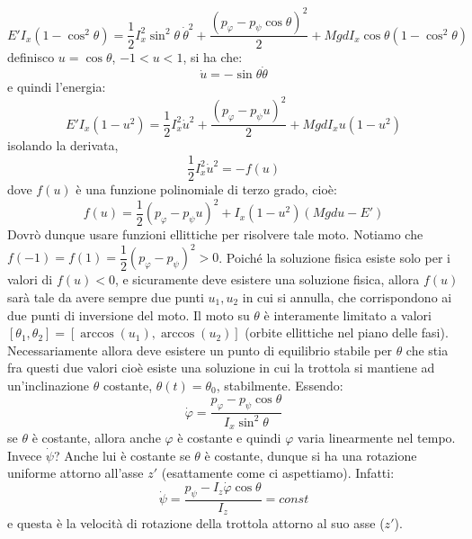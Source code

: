 \documentclass[a4paper,openany]{article}
\begin{document}
	$$
	E'I_x(1-\cos^2\theta) = \dfrac{1}{2}I_x^{2}\sin^2\theta\>\dot{\theta}^{2}+ \dfrac{(p_{\varphi}- p_{\psi}\cos\theta)^2}{2} + MgdI_x\cos\theta(1-\cos^2\theta) 
	$$
	definisco $u = \cos\theta$, $-1<u<1$, si ha che:
	$$
	\dot{u} = -\sin\theta \dot{\theta}
	$$
	e quindi l'energia:
	$$
	E'I_x(1-u^2) = \dfrac{1}{2}I_x^{2}\dot{u}^{2}+ \dfrac{(p_{\varphi}- p_{\psi}u)^2}{2} + MgdI_x u (1-u^2) 
	$$
	isolando la derivata,
	$$
	\dfrac{1}{2}I_x^{2} \dot{u}^2 = -f(u)
	$$
	dove $f(u)$ è una funzione polinomiale di terzo grado, cioè:
	$$
	f(u) = \dfrac{1}{2}(p_{\varphi}-p_{\psi}u)^2 + I_x(1-u^2)(Mgdu - E')
	$$
	Dovrò dunque usare funzioni ellittiche per risolvere tale moto. Notiamo che $f(-1) = f(1) = \dfrac{1}{2}(p_{\varphi}-p_{\psi})^2 > 0$. Poiché la soluzione fisica esiste solo per i valori di $f(u)<0$, e sicuramente deve esistere una soluzione fisica, allora $f(u)$ sarà tale da avere sempre due punti $u_1,u_2$ in cui si annulla, che corrispondono ai due punti di inversione del moto. Il moto su $\theta$ è interamente limitato a valori $[\theta_1,\theta_2] = [\arccos(u_1),\arccos(u_2)]$ (orbite ellittiche nel piano delle fasi). Necessariamente allora deve esistere un punto di equilibrio stabile per $\theta$ che stia fra questi due valori cioè esiste una soluzione in cui la trottola si mantiene ad un'inclinazione $\theta$ costante, $\theta(t) = \theta_0$, stabilmente. Essendo:
	\begin{equation}
		\dot{\varphi} = \dfrac{p_{\varphi}-p_{\psi}\cos\theta}{I_x \sin^2\theta}
		\label{phidot}
	\end{equation}
	se $\theta$ è costante, allora anche $\varphi$ è costante e quindi $\varphi$ varia linearmente nel tempo. Invece $\dot{\psi}$? Anche lui è costante se $\theta$ è costante, dunque si ha una rotazione uniforme attorno all'asse $z'$ (esattamente come ci aspettiamo). Infatti:
	$$
	\dot{\psi}= \dfrac{p_\psi - I_z\dot{\varphi}\cos\theta}{I_z} = const
	$$
	e questa è la velocità di rotazione della trottola attorno al suo asse ($z'$).
	
	
	
\end{document}
